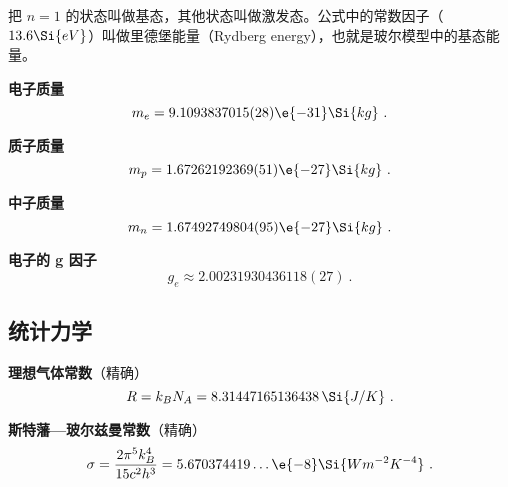 把 $n = 1$ 的状态叫做基态，其他状态叫做激发态。公式中的常数因子（$13.6 \Si{eV}$）叫做里德堡能量（Rydberg energy），也就是玻尔模型中的基态能量。

\textbf{电子质量}
\begin{equation}\label{eq_Consts_1}
m_e = 9.1093837015(28)\e{-31} \Si{kg}~.
\end{equation}

\textbf{质子质量}
\begin{equation}\label{eq_Consts_2}
m_p = 1.67262192369(51)\e{-27}\Si{kg}~.
\end{equation}

\textbf{中子质量}
\begin{equation}
m_n = 1.67492749804(95)\e{-27}\Si{kg}~.
\end{equation}

\textbf{电子的 g 因子}
\begin{equation}
g_e \approx 2.00231930436118(27)~.
\end{equation}

\subsection{统计力学}

\textbf{理想气体常数}（精确）
\begin{equation}
R = k_B N_A = 8.31447165136438 \,\Si{J/K}~.
\end{equation}

\textbf{斯特藩—玻尔兹曼常数}（精确）
\begin{equation}
\sigma = \frac{2\pi^5k_B^4}{15c^2h^3} = 5.670374419\dots\e{-8} \Si{Wm^{-2}K^{-4}}~.
\end{equation}

